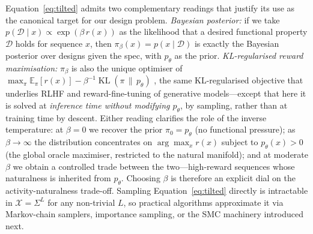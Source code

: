 \documentclass{article}
\theoremstyle{definition}
\theoremstyle{remark}
\newcommand{\E}{\mathbb{E}}
\newcommand{\KL}{\operatorname{KL}}
\begin{document}
Equation~\ref{eq:tilted} admits two complementary readings that justify its use as the canonical target for our design problem. \emph{Bayesian posterior:} if we take $p(\mathcal{D}\!\mid\!x)\!\propto\!\exp(\beta\,r(x))$ as the likelihood that a desired functional property $\mathcal{D}$ holds for sequence $x$, then $\pi_\beta(x)\!=\!p(x\!\mid\!\mathcal{D})$ is exactly the Bayesian posterior over designs given the spec, with $p_\theta$ as the prior. \emph{KL-regularised reward maximisation:} $\pi_\beta$ is also the unique optimiser of $\max_\pi \E_{\pi}[r(x)]-\beta^{-1}\KL(\pi\,\|\,p_\theta)$ \citep{ouyang2022rlhf}, the same KL-regularised objective that underlies RLHF and reward-fine-tuning of generative models---except that here it is solved at \emph{inference time without modifying $p_\theta$}, by sampling, rather than at training time by descent. Either reading clarifies the role of the inverse temperature: at $\beta\!=\!0$ we recover the prior $\pi_0\!=\!p_\theta$ (no functional pressure); as $\beta\!\to\!\infty$ the distribution concentrates on $\arg\max_{x} r(x)$ subject to $p_\theta(x)\!>\!0$ (the global oracle maximiser, restricted to the natural manifold); and at moderate $\beta$ we obtain a controlled trade between the two---high-reward sequences whose naturalness is inherited from $p_\theta$. Choosing $\beta$ is therefore an explicit dial on the activity-naturalness trade-off. Sampling Equation~\ref{eq:tilted} directly is intractable in $\mathcal{X}=\Sigma^L$ for any non-trivial $L$, so practical algorithms approximate it via Markov-chain samplers, importance sampling, or the SMC machinery introduced next.
\end{document}
